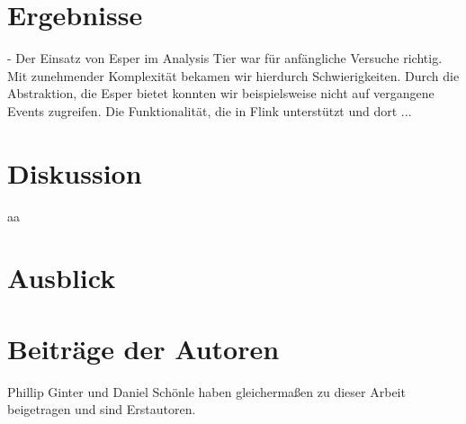 \section{Ergebnisse}
- Der Einsatz von Esper im Analysis Tier war für anfängliche Versuche richtig.
Mit zunehmender Komplexität bekamen wir hierdurch Schwierigkeiten. Durch die Abstraktion, die Esper bietet konnten
wir beispielsweise nicht auf vergangene Events zugreifen. Die Funktionalität, die in Flink unterstützt und dort ...

\section{Diskussion}
aa
\section{Ausblick}

\section{Beiträge der Autoren}
 Phillip Ginter und Daniel Schönle haben gleichermaßen zu dieser Arbeit beigetragen und sind Erstautoren.